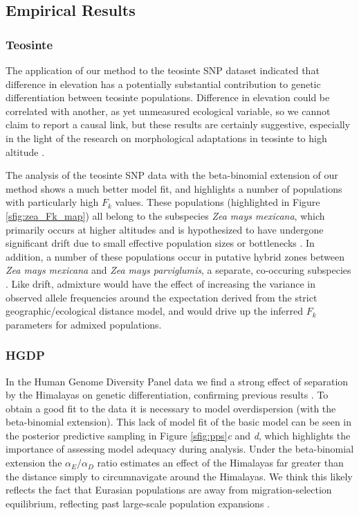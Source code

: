 \subsection*{Empirical Results}

\subsubsection*{Teosinte}

The application of our method to the teosinte SNP dataset indicated that difference in elevation has a potentially substantial contribution to genetic differentiation between teosinte populations.  Difference in elevation could be correlated with another, as yet unmeasured ecological variable, so we cannot claim to report a causal link, but these results are certainly suggestive, especially in the light of the research on morphological adaptations in teosinte to high altitude \citep{EaglesLothrop1994}.  

The analysis of the teosinte SNP data with the beta-binomial extension of our method shows a much better model fit, and highlights a number of populations with particularly high $F_{k}$ values.  These populations (highlighted in Figure \ref{sfig:zea_Fk_map}) all belong to the subspecies \textit{Zea mays mexicana}, which primarily occurs at higher altitudes and is hypothesized to have undergone significant drift due to small effective population sizes or bottlenecks \citep{Fukunaga2005}.  In addition, a number of these populations occur in putative hybrid zones between \textit{Zea mays mexicana} and \textit{Zea mays parviglumis}, a separate, co-occuring subspecies \citep{vanHeerwaarden2011}.  Like drift, admixture would have the effect of increasing the variance in observed allele frequencies around the expectation derived from the strict geographic/ecological distance model, and would drive up the inferred $F_{k}$ parameters for admixed populations.  

\subsubsection*{HGDP}

In the Human Genome Diversity Panel data we find a strong effect of separation by the Himalayas on genetic differentiation, confirming previous results \citep[e.g.][]{Rosenberg2005}.
To obtain a good fit to the data it is necessary to model overdispersion (with the beta-binomial extension).  This lack of model fit of the basic model can be seen in the posterior predictive sampling in Figure \ref{sfig:pps}\textit{c} and \textit{d}, which highlights the importance of assessing model adequacy during analysis. 
Under the beta-binomial extension the $\alpha_E/\alpha_D$ ratio estimates an effect of the Himalayas far greater than the distance simply to circumnavigate around the Himalayas.  We think this likely reflects the fact that Eurasian populations are away from migration-selection equilibrium, reflecting past large-scale population expansions \citep{Keinan2007}.

